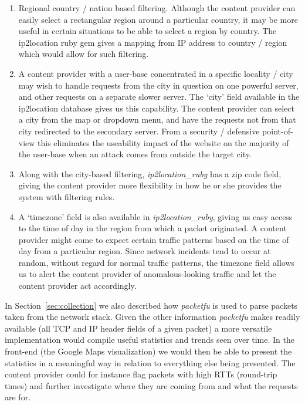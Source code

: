 \documentclass[aps,preprint,amsmath,amssymb]{revtex4}
\begin{document}
\begin{enumerate}
\item Regional country / nation based filtering. Although the content provider can easily select
a rectangular region around a particular country, it may be more useful in certain
situations to be able to select a region by country. The ip2location ruby gem gives
a mapping from IP address to country / region which would allow for such filtering.
\item A content provider with a user-base concentrated in a specific locality / city
may wish to handle requests from the city in question on one powerful server, and
other requests on a separate slower server. The `city' field available in the ip2location
database gives us this capability. The content provider can select a city from the map
or dropdown menu, and have the requests not from that city redirected to the secondary
server. From a security / defensive point-of-view this eliminates the useability impact of
the website on the majority of the user-base when an attack comes from outside the target city.
\item Along with the city-based filtering, \emph{ip2location\_ruby} has a zip code field,
giving the content provider more flexibility in how he or she provides the system with
filtering rules.
\item A `timezone' field is also available in \emph{ip2location\_ruby}, giving us easy
access to the time of day in the region from which a packet originated. A content provider
might come to expect certain traffic patterns based on the time of day from a particular
region. Since network incidents tend to occur at random, without regard for normal
traffic patterns, the timezone field allows us to alert the content provider of anomalous-looking
traffic and let the content provider act accordingly.
\end{enumerate}

In Section~\ref{sec:collection} we also described how \emph{packetfu} is used to parse
packets taken from the network stack. Given the other information \emph{packetfu} makes
readily available (all TCP and IP header fields of a given packet) a more versatile
implementation would compile useful statistics and trends seen over time. In the front-end
(the Google Maps visualization) we would then be able to present the statistics in a
meaningful way in relation to everything else being presented. The content provider could
for instance flag packets with high RTTs (round-trip times) and further investigate where
they are coming from and what the requests are for.
\end{document}
